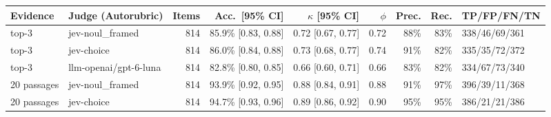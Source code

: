 \begin{tabular}{@{}llrrrrrrl@{}}
\toprule
Evidence & Judge (Autorubric) & Items & Acc.\ [95\% CI] & $\kappa$ [95\% CI] & $\phi$ & Prec. & Rec. & TP/FP/FN/TN \\
\midrule
top-3 & jev-noul\_framed & 814 & 85.9\% [0.83, 0.88] & 0.72 [0.67, 0.77] & 0.72 & 88\% & 83\% & 338/46/69/361 \\
top-3 & jev-choice & 814 & 86.0\% [0.84, 0.88] & 0.73 [0.68, 0.77] & 0.74 & 91\% & 82\% & 335/35/72/372 \\
top-3 & llm-openai/gpt-6-luna & 814 & 82.8\% [0.80, 0.85] & 0.66 [0.60, 0.71] & 0.66 & 83\% & 82\% & 334/67/73/340 \\
20 passages & jev-noul\_framed & 814 & 93.9\% [0.92, 0.95] & 0.88 [0.84, 0.91] & 0.88 & 91\% & 97\% & 396/39/11/368 \\
20 passages & jev-choice & 814 & 94.7\% [0.93, 0.96] & 0.89 [0.86, 0.92] & 0.90 & 95\% & 95\% & 386/21/21/386 \\
\bottomrule
\end{tabular}
